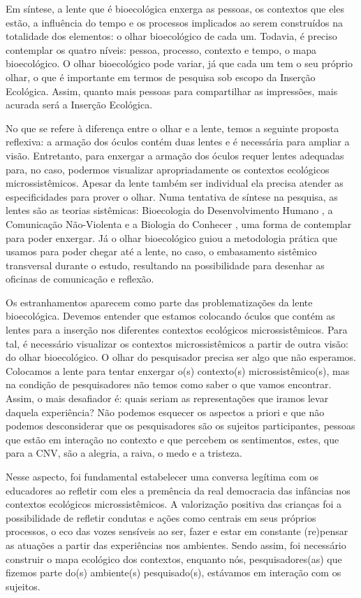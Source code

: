 \documentclass{textolivre-html}
\begin{document}
Em síntese, a lente que é bioecológica enxerga as pessoas, os contextos que eles estão, a influência do tempo e os processos implicados ao serem construídos na totalidade dos elementos: o olhar bioecológico de cada um. Todavia, é preciso contemplar os quatro níveis: pessoa, processo, contexto e tempo, o mapa bioecológico. O olhar bioecológico pode variar, já que cada um tem o seu próprio olhar, o que é importante em termos de pesquisa sob escopo da Inserção Ecológica. Assim, quanto mais pessoas para compartilhar as impressões, mais acurada será a Inserção Ecológica. 

No que se refere à diferença entre o olhar e a lente, temos a seguinte proposta reflexiva: a armação dos óculos contém duas lentes e é necessária para ampliar a visão. Entretanto, para enxergar a armação dos óculos requer lentes adequadas para, no caso, podermos visualizar apropriadamente os contextos ecológicos microssistêmicos. Apesar da lente também ser individual ela precisa atender as especificidades para prover o olhar. Numa tentativa de síntese na pesquisa, as lentes são as teorias sistêmicas: Bioecologia do Desenvolvimento Humano \cite{brofen2011}, a Comunicação Não-Violenta \cite{rosenberg2006} e a Biologia do Conhecer \cite{maturana2011}, uma forma de contemplar para poder enxergar. Já o olhar bioecológico guiou a metodologia prática que usamos para poder chegar até a lente, no caso, o embasamento sistêmico transversal durante o estudo, resultando na possibilidade para desenhar as oficinas de comunicação e reflexão.

Os estranhamentos aparecem como parte das problematizações da lente bioecológica. Devemos entender que estamos colocando óculos que contém as lentes para a inserção nos diferentes contextos ecológicos microssistêmicos. Para tal, é necessário visualizar os contextos microssistêmicos a partir de outra visão: do olhar bioecológico. O olhar do pesquisador precisa ser algo que não esperamos. Colocamos a lente para tentar enxergar o(s) contexto(s) microssistêmico(s), mas na condição de pesquisadores não temos como saber o que vamos encontrar. Assim, o mais desafiador é: quais seriam as representações que iramos levar daquela experiência? Não podemos esquecer os aspectos a priori e que não podemos desconsiderar que os pesquisadores são os sujeitos participantes, pessoas que estão em interação no contexto e que percebem os sentimentos, estes, que para a CNV, são a alegria, a raiva, o medo e a tristeza.

Nesse aspecto, foi fundamental estabelecer uma conversa legítima com os educadores ao refletir com eles a premência da real democracia das infâncias nos contextos ecológicos microssistêmicos. A valorização positiva das crianças foi a possibilidade de refletir condutas e ações como centrais em seus próprios processos, o eco das vozes sensíveis ao ser, fazer e estar em constante (re)pensar as atuações a partir das experiências nos ambientes. Sendo assim, foi necessário construir o mapa ecológico dos contextos, enquanto nós, pesquisadores(as) que fizemos parte do(s) ambiente(s) pesquisado(s), estávamos em interação com os sujeitos. 
\end{document}
